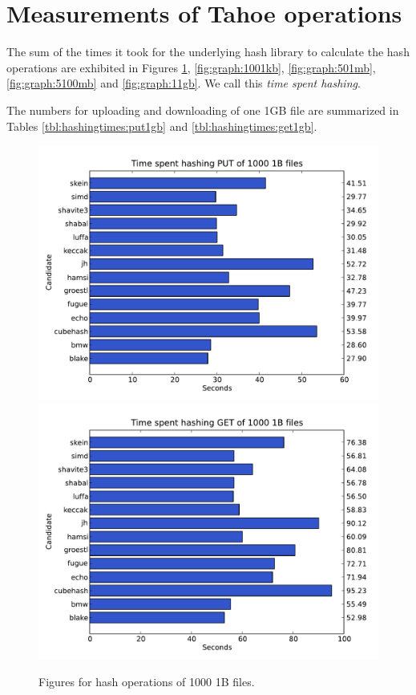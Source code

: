 \documentclass[english,12pt,a4paper]{book}
\begin{document}
\section{Measurements of Tahoe operations}


The sum of the times it took for the underlying hash library to calculate the
hash operations are exhibited in Figures \ref{fig:graph:10001b},
\ref{fig:graph:1001kb}, \ref{fig:graph:501mb}, \ref{fig:graph:5100mb} and
\ref{fig:graph:11gb}. We call this \emph{time spent hashing}.

The numbers for uploading and downloading of one 1GB file are summarized in
Tables \ref{tbl:hashingtimes:put1gb} and \ref{tbl:hashingtimes:get1gb}.



\begin{figure}[h!]
    \centering
    \includegraphics[width=0.9\columnwidth]{graphs/TimespenthashingPUTof10001Bfiles.pdf}
    \includegraphics[width=0.9\columnwidth]{graphs/TimespenthashingGETof10001Bfiles.pdf}
    \caption{Figures for hash operations of 1000 1B files.}
    \label{fig:graph:10001b}
\end{figure}
\end{document}
